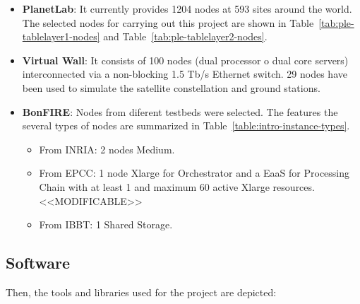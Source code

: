 \begin{itemize}
\item \textbf{PlanetLab}: It currently provides 1204 nodes at 593 sites around
  the world. The selected nodes for carrying out this project are shown in
  Table~\ref{tab:ple-tablelayer1-nodes} and Table~\ref{tab:ple-tablelayer2-nodes}.

\item \textbf{Virtual Wall}: It consists of 100 nodes (dual processor o dual
  core servers) interconnected via a non-blocking 1.5 Tb/s Ethernet switch. 29
  nodes have been used to simulate the satellite constellation and ground
  stations. 

\item \textbf{BonFIRE}: Nodes from diferent testbeds were selected. The
  features the several types of nodes are summarized in Table~\ref{table:intro-instance-types}.
  \begin{itemize}
    \item From INRIA: 2 nodes Medium.
    \item From EPCC: 1 node Xlarge for Orchestrator and a \ac{EaaS} for
      Processing Chain with at least 1  and maximum 60 active Xlarge resources. <<MODIFICABLE>>
    \item From IBBT: 1 Shared Storage.

    \end{itemize}
\end{itemize}


\subsection{Software}

Then, the tools and libraries used for the project are depicted:

